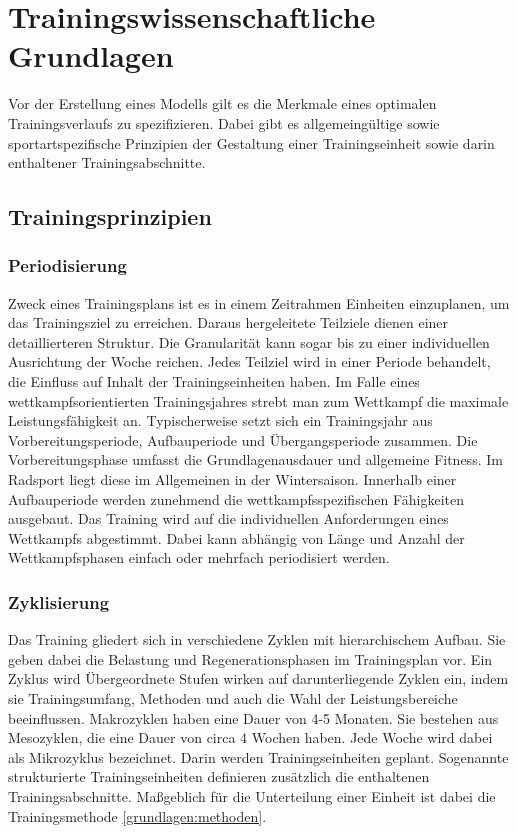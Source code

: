 \chapter{Trainingswissenschaftliche Grundlagen}
\label{sec:grundlagen:rad}
Vor der Erstellung eines Modells gilt es die Merkmale eines optimalen Trainingsverlaufs zu spezifizieren. Dabei gibt es allgemeingültige sowie sportartspezifische Prinzipien der Gestaltung einer Trainingseinheit sowie darin enthaltener Trainingsabschnitte.

\section{Trainingsprinzipien}
\subsection{Periodisierung}
    Zweck eines Trainingsplans ist es in einem Zeitrahmen Einheiten einzuplanen, um das Trainingsziel zu erreichen. Daraus hergeleitete Teilziele dienen einer detaillierteren Struktur. Die Granularität kann sogar bis zu einer individuellen Ausrichtung der Woche reichen. Jedes Teilziel wird in einer Periode behandelt, die Einfluss auf Inhalt der Trainingseinheiten haben.\cite{periodization} \newline
    Im Falle eines wettkampfsorientierten Trainingsjahres strebt man zum Wettkampf die maximale Leistungsfähigkeit an. Typischerweise setzt sich ein Trainingsjahr aus Vorbereitungsperiode, Aufbauperiode und Übergangsperiode zusammen.\cite[279]{Trainingswissenschaft} Die Vorbereitungsphase umfasst die Grundlagenausdauer und allgemeine Fitness. Im Radsport liegt diese im Allgemeinen in der Wintersaison. Innerhalb einer Aufbauperiode werden zunehmend die wettkampfsspezifischen Fähigkeiten ausgebaut. Das Training wird auf die individuellen Anforderungen eines Wettkampfs abgestimmt. Dabei kann abhängig von Länge und Anzahl der Wettkampfsphasen einfach oder mehrfach periodisiert werden.
\subsection{Zyklisierung}
    Das Training gliedert sich in verschiedene Zyklen mit hierarchischem Aufbau. Sie geben dabei die Belastung und Regenerationsphasen im Trainingsplan vor. Ein Zyklus wird  Übergeordnete Stufen wirken auf darunterliegende Zyklen ein, indem sie Trainingsumfang, Methoden und auch die Wahl der Leistungsbereiche beeinflussen. \cite[283]{Trainingswissenschaft}
    Makrozyklen haben eine Dauer von 4-5 Monaten. Sie bestehen aus Mesozyklen, die eine Dauer von circa 4 Wochen haben. Jede Woche wird dabei als Mikrozyklus bezeichnet. Darin werden Trainingseinheiten geplant. Sogenannte strukturierte Trainingseinheiten definieren zusätzlich die enthaltenen Trainingsabschnitte. Maßgeblich für die Unterteilung einer Einheit ist dabei die Trainingsmethode \ref{grundlagen:methoden}.
